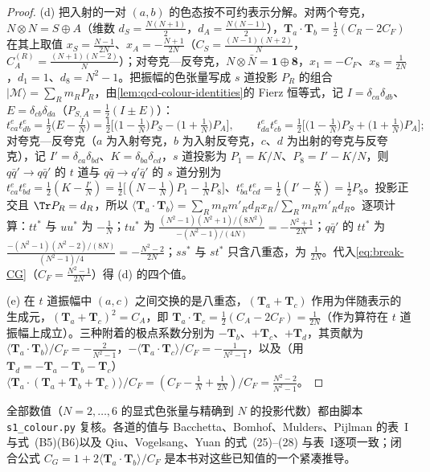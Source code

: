 \begin{proof}
(d) 把入射的一对 $(a,b)$ 的色态按不可约表示分解。对两个夸克，$N\otimes N=S\oplus A$（维数 $d_S=\frac{N(N+1)}2$，$d_A=\frac{N(N-1)}2$），$\mathbf T_a\cdot\mathbf T_b=\frac12(C_R-2C_F)$ 在其上取值 $x_S=\frac{N-1}{2N}$、$x_A=-\frac{N+1}{2N}$（$C_S=\frac{(N-1)(N+2)}N$，$C_A^{(R)}=\frac{(N+1)(N-2)}N$）；对夸克—反夸克，$N\otimes\bar N=\mathbf 1\oplus\mathbf 8$，$x_1=-C_F$、$x_8=\frac1{2N}$，$d_1=1$、$d_8=N^2-1$。把振幅的色张量写成 $s$ 道投影 $P_R$ 的组合 $|\mathcal M\rangle=\sum_Rm_RP_R$，由\cref{lem:qcd-colour-identities}的 Fierz 恒等式，记 $I=\delta_{ca}\delta_{db}$、$E=\delta_{cb}\delta_{da}$（$P_{S,A}=\frac12(I\pm E)$）：
\[
t^e_{ca}t^e_{db}=\tfrac12\big(E-\tfrac IN\big)=\tfrac12\Big[\big(1-\tfrac1N\big)P_S-\big(1+\tfrac1N\big)P_A\Big],\qquad
t^e_{da}t^e_{cb}=\tfrac12\Big[\big(1-\tfrac1N\big)P_S+\big(1+\tfrac1N\big)P_A\Big];
\]
对夸克—反夸克（$a$ 为入射夸克，$b$ 为入射反夸克，$c$、$d$ 为出射的夸克与反夸克），记 $I'=\delta_{ca}\delta_{bd}$、$K=\delta_{ba}\delta_{cd}$，$s$ 道投影为 $P_1=K/N$、$P_8=I'-K/N$，则 $q\bar q'\to q\bar q'$ 的 $t$ 道与 $q\bar q\to q'\bar q'$ 的 $s$ 道分别为 $t^e_{ca}t^e_{bd}=\frac12(K-\frac{I'}N)=\frac12\big[(N-\frac1N)P_1-\frac1NP_8\big]$、$t^e_{ba}t^e_{cd}=\frac12(I'-\frac KN)=\frac12P_8$。投影正交且 $\Tr P_R=d_R$，所以
$\langle\mathbf T_a\cdot\mathbf T_b\rangle=\sum_Rm_Rm'_Rd_Rx_R\big/\sum_Rm_Rm'_Rd_R$。逐项计算：$tt^*$ 与 $uu^*$ 为 $-\frac1N$；$tu^*$ 为 $\frac{(N^2-1)(N^2+1)/(8N^2)}{-(N^2-1)/(4N)}=-\frac{N^2+1}{2N}$；$q\bar q'$ 的 $tt^*$ 为 $\frac{-(N^2-1)(N^2-2)/(8N)}{(N^2-1)/4}=-\frac{N^2-2}{2N}$；$ss^*$ 与 $st^*$ 只含八重态，为 $\frac1{2N}$。代入\cref{eq:break-CG}（$C_F=\frac{N^2-1}{2N}$）得 (d) 的四个值。

(e) 在 $t$ 道振幅中 $(a,c)$ 之间交换的是八重态，$(\mathbf T_a+\mathbf T_c)$ 作用为伴随表示的生成元，$(\mathbf T_a+\mathbf T_c)^2=C_A$，即 $\mathbf T_a\cdot\mathbf T_c=\frac12(C_A-2C_F)=\frac1{2N}$（作为算符在 $t$ 道振幅上成立）。三种附着的极点系数分别为 $-\mathbf T_b$、$+\mathbf T_c$、$+\mathbf T_d$，其贡献为 $\langle\mathbf T_a\cdot\mathbf T_b\rangle/C_F=-\frac{2}{N^2-1}$，$-\langle\mathbf T_a\cdot\mathbf T_c\rangle/C_F=-\frac1{N^2-1}$，以及（用 $\mathbf T_d=-\mathbf T_a-\mathbf T_b-\mathbf T_c$）$\langle\mathbf T_a\cdot(\mathbf T_a+\mathbf T_b+\mathbf T_c)\rangle/C_F=(C_F-\frac1N+\frac1{2N})/C_F=\frac{N^2-2}{N^2-1}$。
\end{proof}

全部数值（$N=2,\dots,6$ 的显式色张量与精确到 $N$ 的投影代数）都由脚本 \texttt{s1\_colour.py} 复核。各道的值与 Bacchetta、Bomhof、Mulders、Pijlman 的表~I 与式~(B5)(B6)\cite{BacchettaBomhofMuldersPijlman2005}以及 Qiu、Vogelsang、Yuan 的式~(25)--(28) 与表~I\cite{QiuVogelsangYuan2007}逐项一致；闭合公式 $C_G=1+2\langle\mathbf T_a\cdot\mathbf T_b\rangle/C_F$ 是本书对这些已知值的一个紧凑推导。

